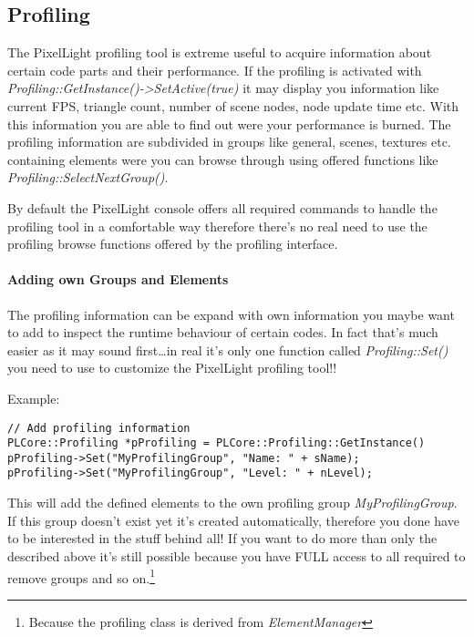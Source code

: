 \subsection{Profiling}
The PixelLight profiling tool is extreme useful to acquire information about certain code parts and their performance. If the profiling is activated with \emph{Profiling::GetInstance()->SetActive(true)} it may display you information like current \ac{FPS}, triangle count, number of scene nodes, node update time etc. With this information you are able to find out were your performance is burned. The profiling information are subdivided in groups like general, scenes, textures etc. containing elements were you can browse through using offered functions like \emph{Profiling::SelectNextGroup()}.

By default the PixelLight console offers all required commands to handle the profiling tool in a comfortable way therefore there's no real need to use the profiling browse functions offered by the profiling interface.


\paragraph{Adding own Groups and Elements}
The profiling information can be expand with own information you maybe want to add to inspect the runtime behaviour of certain codes. In fact that's much easier as it may sound first\ldots in real it's only one function called \emph{Profiling::Set()} you need to use to customize the PixelLight profiling tool!!

Example:

\begin{lstlisting}[caption=Profiling usage example]
// Add profiling information
PLCore::Profiling *pProfiling = PLCore::Profiling::GetInstance()
pProfiling->Set("MyProfilingGroup", "Name: " + sName);
pProfiling->Set("MyProfilingGroup", "Level: " + nLevel);
\end{lstlisting}

This will add the defined elements to the own profiling group \emph{MyProfilingGroup}. If this group doesn't exist yet it's created automatically, therefore you done have to be interested in the stuff behind all! If you want to do more than only the described above it's still possible because you have FULL access to all required to remove groups and so on.\footnote{Because the profiling class is derived from \emph{ElementManager}}





